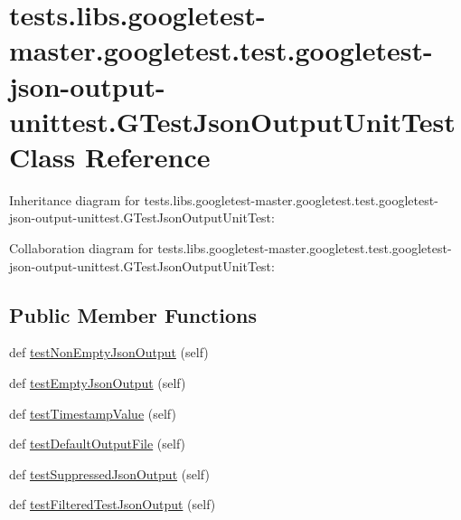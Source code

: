\hypertarget{classtests_1_1libs_1_1googletest-master_1_1googletest_1_1test_1_1googletest-json-output-unittest_1_1GTestJsonOutputUnitTest}{}\section{tests.\+libs.\+googletest-\/master.googletest.\+test.\+googletest-\/json-\/output-\/unittest.G\+Test\+Json\+Output\+Unit\+Test Class Reference}
\label{classtests_1_1libs_1_1googletest-master_1_1googletest_1_1test_1_1googletest-json-output-unittest_1_1GTestJsonOutputUnitTest}


Inheritance diagram for tests.\+libs.\+googletest-\/master.googletest.\+test.\+googletest-\/json-\/output-\/unittest.G\+Test\+Json\+Output\+Unit\+Test\+:


Collaboration diagram for tests.\+libs.\+googletest-\/master.googletest.\+test.\+googletest-\/json-\/output-\/unittest.G\+Test\+Json\+Output\+Unit\+Test\+:
\subsection*{Public Member Functions}
\begin{DoxyCompactItemize}
\item 
def \hyperlink{classtests_1_1libs_1_1googletest-master_1_1googletest_1_1test_1_1googletest-json-output-unittest_1_1GTestJsonOutputUnitTest_aeb718486207569a39c685019ae3330e8}{test\+Non\+Empty\+Json\+Output} (self)
\item 
def \hyperlink{classtests_1_1libs_1_1googletest-master_1_1googletest_1_1test_1_1googletest-json-output-unittest_1_1GTestJsonOutputUnitTest_a193205bfd1b9c77ff1eef724cee31bb5}{test\+Empty\+Json\+Output} (self)
\item 
def \hyperlink{classtests_1_1libs_1_1googletest-master_1_1googletest_1_1test_1_1googletest-json-output-unittest_1_1GTestJsonOutputUnitTest_a72606585284620a471bd2982d09ea004}{test\+Timestamp\+Value} (self)
\item 
def \hyperlink{classtests_1_1libs_1_1googletest-master_1_1googletest_1_1test_1_1googletest-json-output-unittest_1_1GTestJsonOutputUnitTest_ac5be039e3fca9bd0283fd251781c33e0}{test\+Default\+Output\+File} (self)
\item 
def \hyperlink{classtests_1_1libs_1_1googletest-master_1_1googletest_1_1test_1_1googletest-json-output-unittest_1_1GTestJsonOutputUnitTest_a64e2c6371e5f38c98c9766c5b58f4b2c}{test\+Suppressed\+Json\+Output} (self)
\item 
def \hyperlink{classtests_1_1libs_1_1googletest-master_1_1googletest_1_1test_1_1googletest-json-output-unittest_1_1GTestJsonOutputUnitTest_a3a0f1708b30a83856a033857a5425773}{test\+Filtered\+Test\+Json\+Output} (self)
\end{DoxyCompactItemize}


